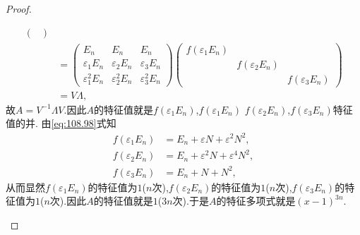 \documentclass[../../main.tex]{subfiles}%
\begin{document}
\begin{proof}
\begin{enumerate}[(1)]
\begin{align*}
\begin{pmatrix}
\end{pmatrix} \\
&= \begin{pmatrix}
E_n & E_n & E_n\\
\varepsilon_1 E_n & \varepsilon_2 E_n & \varepsilon_3 E_n\\
\varepsilon_1^2 E_n & \varepsilon_2^2 E_n & \varepsilon_3^2 E_n
\end{pmatrix} \begin{pmatrix}
f(\varepsilon_1 E_n) & & \\
& f(\varepsilon_2 E_n) & \\
& & f(\varepsilon_3 E_n)
\end{pmatrix}\\
& = V\Lambda,
\end{align*}
故$A = V^{-1}\Lambda V$.因此$A$的特征值就是$f(\varepsilon_1 E_n)$,$f(\varepsilon_1 E_n)$ $f(\varepsilon_2 E_n)$,$f(\varepsilon_3 E_n)$特征值的并.
由\eqref{eq:108.98}式知
\begin{align*}
f(\varepsilon_1 E_n) &=  E_n + \varepsilon N + \varepsilon^2 N^2, \\
f(\varepsilon_2 E_n) &=  E_n + \varepsilon^2 N + \varepsilon^4 N^2, \\
f(\varepsilon_3 E_n) &= E_n + N + N^2,
\end{align*}
从而显然$f(\varepsilon_1 E_n)$的特征值为$1$($n$次),$f(\varepsilon_2 E_n)$的特征值为$1$($n$次),$f(\varepsilon_3 E_n)$的特征值为$1$($n$次).因此$A$的特征值就是$1$($3n$次).于是$A$的特征多项式就是$(x - 1)^{3n} $.
\end{enumerate}
\end{proof}
\end{document}
